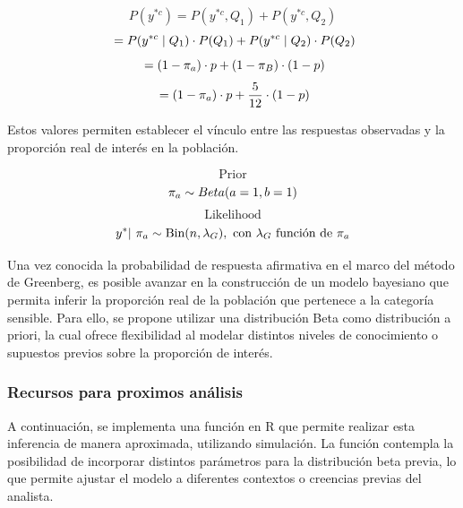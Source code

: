 \documentclass[
]{article}
\begin{document}
\[ P(y^{*c}) = P(y^{*c},Q_1) + P(y^{*c},Q_2)\]
\[\\= P(y^{*c} \mid Q_1) \cdot P(Q_1) + P(y^{*c} \mid Q_2) \cdot P(Q_2)\]
\[\\= (1 - \pi_a) \cdot p + (1 - \pi_B) \cdot (1 - p)\]
\[\\= (1 - \pi_a) \cdot p + \dfrac{5}{12} \cdot (1 - p)\]

Estos valores permiten establecer el vínculo entre las respuestas
observadas y la proporción real de interés en la población.

\[\text{Prior}\] \[ \pi_a \sim Beta(a = 1, b = 1) \\\]
\[\text{Likelihood}\]
\[y^*\text{| }\pi_a \sim \text{Bin}(n, \lambda_G), \text{ con } \lambda_G \text{ función de } \pi_a \\\]

Una vez conocida la probabilidad de respuesta afirmativa en el marco del
método de Greenberg, es posible avanzar en la construcción de un modelo
bayesiano que permita inferir la proporción real de la población que
pertenece a la categoría sensible. Para ello, se propone utilizar una
distribución Beta como distribución a priori, la cual ofrece
flexibilidad al modelar distintos niveles de conocimiento o supuestos
previos sobre la proporción de interés.

\subsubsection{Recursos para proximos análisis}\label{subtitulo-11}

A continuación, se implementa una función en R que permite realizar esta
inferencia de manera aproximada, utilizando simulación. La función
contempla la posibilidad de incorporar distintos parámetros para la
distribución beta previa, lo que permite ajustar el modelo a diferentes
contextos o creencias previas del analista.
\end{document}
